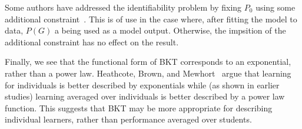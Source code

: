 \documentclass[11pt,letterpaper]{article}
\begin{document}
Some authors have addressed the identifiability problem by 
%
fixing $P_0$ using some additional constraint~\cite{fix}.  
This is of use in the case where, after fitting the model to data, 
$P(G)$ a being used as a model output.  Otherwise, the impsition
of the additional constraint has no effect on the result.


Finally, we see that the functional form of BKT corresponds 
to an exponential, rather than a power law.  
Heathcote, Brown, and Mewhort~\cite{heathcote_power_2000}
argue that learning for individuals is better described by
exponentials while (as shown in earlier studies) learning averaged
over individuals is better described by a power law function.
This suggests that BKT may be more appropriate for describing
individual learners, rather than performance averaged over students.


%
%


\end{document}
